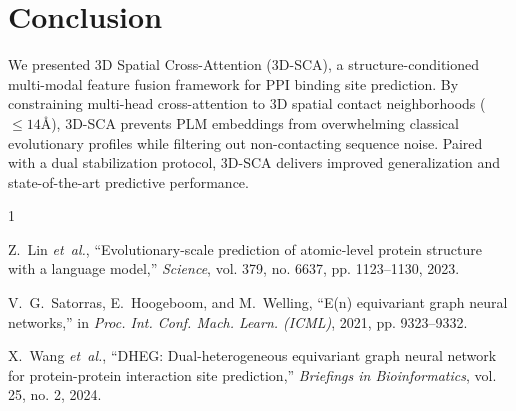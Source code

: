 \documentclass[10pt,journal,compsoc]{IEEEtran}
\begin{document}
\section{Conclusion}
We presented 3D Spatial Cross-Attention (3D-SCA), a structure-conditioned multi-modal feature fusion framework for PPI binding site prediction. By constraining multi-head cross-attention to 3D spatial contact neighborhoods ($\le 14\text{Å}$), 3D-SCA prevents PLM embeddings from overwhelming classical evolutionary profiles while filtering out non-contacting sequence noise. Paired with a dual stabilization protocol, 3D-SCA delivers improved generalization and state-of-the-art predictive performance.

\begin{thebibliography}{1}

Z.~Lin \emph{et~al.}, ``Evolutionary-scale prediction of atomic-level protein structure with a language model,'' \emph{Science}, vol. 379, no. 6637, pp. 1123--1130, 2023.

V.~G.~Satorras, E.~Hoogeboom, and M.~Welling, ``E(n) equivariant graph neural networks,'' in \emph{Proc. Int. Conf. Mach. Learn. (ICML)}, 2021, pp. 9323--9332.

X.~Wang \emph{et~al.}, ``DHEG: Dual-heterogeneous equivariant graph neural network for protein-protein interaction site prediction,'' \emph{Briefings in Bioinformatics}, vol. 25, no. 2, 2024.

\end{thebibliography}
\end{document}
